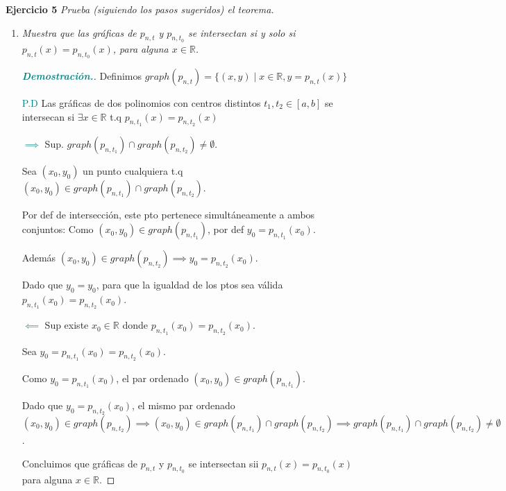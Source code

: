 \documentclass[12pt, letterpaper]{article}
\begin{document}
\vspace{0.4cm}
\noindent \textbf{Ejercicio 5} \textit{Prueba (siguiendo los pasos sugeridos) el teorema.}
\begin{enumerate}[label=(\alph*)]
    \item \textit{Muestra que las gráficas de $p_{n,t}$ y $p_{n,t_0}$ se intersectan si y solo si $p_{n,t}(x) = p_{n,t_0}(x)$, para alguna $x \in \mathbb{R}$.}
    
    \begin{proof}[\textbf{\textcolor{teal}{Demostración.}}]
        Definimos $graph(p_{n,t}) = \{(x,y) \mid x \in \mathbb{R} , y = p_{n,t}(x)\}$
        
        {\textcolor{teal}{P.D}} Las gráficas de dos polinomios con centros distintos $t_1, t_2 \in [a,b]$ se intersecan si $\exists x \in \mathbb{R}$ t.q $p_{n,t_1}(x) = p_{n,t_2}(x)$
        
        {\textcolor{teal}{$\implies$}} Sup. $graph(p_{n,t_1}) \cap graph(p_{n,t_2}) \neq \emptyset$. 
          
        Sea $(x_0, y_0)$ un punto cualquiera t.q $(x_0, y_0) \in graph(p_{n,t_1}) \cap graph(p_{n,t_2})$. 
        
        Por def de intersección, este pto pertenece simultáneamente a ambos conjuntos: Como $(x_0, y_0) \in graph(p_{n,t_1})$, por def $y_0 = p_{n,t_1}(x_0)$. 
        
        Además $(x_0, y_0) \in graph(p_{n,t_2}) \implies y_0 = p_{n,t_2}(x_0)$. 
        
        Dado que $y_0 = y_0$, para que la igualdad de los ptos sea válida $p_{n,t_1}(x_0) = p_{n,t_2}(x_0)$.
        
        {\textcolor{teal}{$\impliedby$}} Sup existe $x_0 \in \mathbb{R}$ donde $p_{n,t_1}(x_0) = p_{n,t_2}(x_0)$.
        
        Sea $y_0 = p_{n,t_1}(x_0) = p_{n,t_2}(x_0)$. 
        
        Como $y_0 = p_{n,t_1}(x_0)$, el par ordenado $(x_0, y_0) \in graph(p_{n,t_1})$. 
        
        Dado que $y_0 = p_{n,t_2}(x_0)$, el mismo par ordenado $(x_0, y_0) \in graph(p_{n,t_2}) \implies (x_0, y_0) \in graph(p_{n,t_1}) \cap graph(p_{n,t_2}) \implies graph(p_{n,t_1}) \cap graph(p_{n,t_2}) \neq \emptyset$.
        
        Concluimos que gráficas de $p_{n,t}$ y $p_{n,t_0}$ se intersectan sii $p_{n,t}(x) = p_{n,t_0}(x)$ para alguna $x \in \mathbb{R}$.
    \end{proof}


\end{enumerate}
\end{document}
